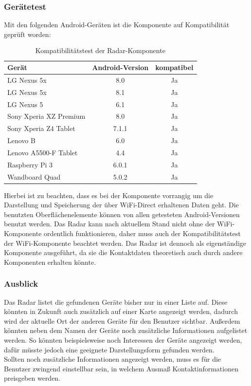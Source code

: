 \subsubsection{Gerätetest}
Mit den folgenden Android-Geräten ist die Komponente auf Kompatibilität geprüft worden:\\
\begin{table}[H]
	\begin{center}
		\begin{tabular}{l|c|c} 			
			Gerät & Android-Version & kompatibel \\
			\hline
			LG Nexus 5x & 8.0 & Ja\\
			LG Nexus 5x & 8.1 & Ja\\
			LG Nexus 5 & 6.1 & Ja\\
			Sony Xperia XZ Premium & 8.0 & Ja\\
			Sony Xperia Z4 Tablet & 7.1.1 & Ja\\
			Lenovo B & 6.0 & Ja\\
			Lenovo A5500-F Tablet & 4.4 & Ja\\
			Raspberry Pi 3 & 6.0.1 & Ja\\	
			Wandboard Quad & 5.0.2 & Ja\\			
		\end{tabular}
		\caption{Kompatibilitätstest der Radar-Komponente}
		\label{tab:dimensions}
	\end{center}
\end{table}
Hierbei ist zu beachten, dass es bei der Komponente vorrangig um die Darstellung und Speicherung der über WiFi-Direct erhaltenen Daten geht. Die benutzten Ober\-flä\-chen\-ele\-mente können von allen getesteten Android-Versionen benutzt werden. Das Radar kann nach aktuellem Stand nicht ohne der WiFi-Komponente ordentlich funktionieren, daher muss auch der Kompatibilitätstest der WiFi-Komponente beachtet werden. Das Radar ist dennoch als eigenständige Komponente ausgeführt, da sie die Kontaktdaten theoretisch auch durch andere Komponenten erhalten könnte.  
\subsubsection{Ausblick}
Das Radar listet die gefundenen Geräte bisher nur in einer Liste auf. Diese könnten in Zukunft auch zusätzlich auf einer Karte angezeigt werden, dadurch wird der aktuelle Ort der anderen Geräte für den Benutzer sichtbar. Außerdem könnten neben dem Namen der Geräte noch zusätzliche Informationen aufgelistet werden. So könnten beispielsweise noch Interessen der Geräte angezeigt werden, dafür müsste jedoch eine geeignete Darstellungsform gefunden werden.
\\Sollten noch zusätzliche Informationen angezeigt werden, muss es für die Benutzer zwingend einstellbar sein, in welchem Ausmaß Kontaktinformationen preisgeben werden.  
\newpage